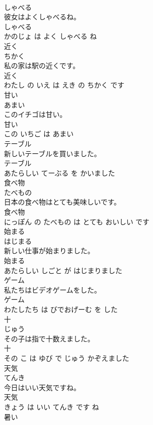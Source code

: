 \documentclass[8pt]{extreport}
\begin{document}
\begin{CJK}{UTF8}{min}
\\	しゃべる	
\\	彼女はよくしゃべるね。	
\\	しゃべる 
\\	かのじょ は よく しゃべる ね			
\\	近く	
\\	ちかく			
\\	私の家は駅の近くです。	
\\	近く 
\\	わたし の いえ は えき の ちかく です			
\\	甘い	
\\	あまい			
\\	このイチゴは甘い。	
\\	甘い 
\\	この いちご は あまい			
\\	テーブル	
\\	新しいテーブルを買いました。	
\\	テーブル 
\\	あたらしい てーぶる を かいました			
\\	食べ物	
\\	たべもの			
\\	日本の食べ物はとても美味しいです。	
\\	食べ物 
\\	にっぽん の たべもの は とても おいしい です			
\\	始まる	
\\	はじまる			
\\	新しい仕事が始まりました。	
\\	始まる 
\\	あたらしい しごと が はじまりました			
\\	ゲーム	
\\	私たちはビデオゲームをした。	
\\	ゲーム 
\\	わたしたち は びでおげーむ を した			
\\	十	
\\	じゅう			
\\	その子は指で十数えました。	
\\	十 
\\	その こ は ゆび で じゅう かぞえました			
\\	天気	
\\	てんき			
\\	今日はいい天気ですね。	
\\	天気 
\\	きょう は いい てんき です ね			
\\	暑い	

\end{CJK}
\end{document}

